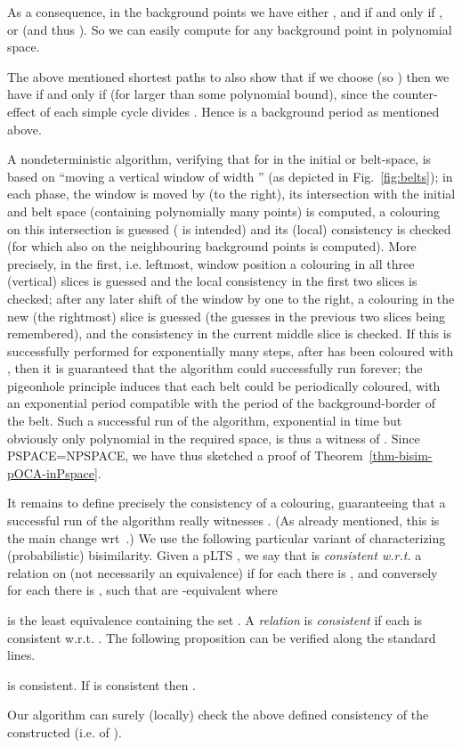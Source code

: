 As a consequence, in the background points 
we have either ,
and  if and only if ,
or 
(and thus  ).
So we can easily compute  for any background point in
polynomial space.

The above mentioned shortest paths to  also show that
if we choose  (so ) then
we have
 if and only if  (for  larger than
some polynomial bound), since the counter-effect of each simple cycle
divides .
Hence
 is a background period as mentioned above.

A nondeterministic algorithm, verifying that  for   in the initial or belt-space,
is based on ``moving a
vertical window of width '' (as depicted in Fig.~\ref{fig:belts});
in each phase, the window is moved by  (to the right),
its intersection with the initial and belt space
(containing polynomially many
points) is computed, a colouring
on this intersection is guessed
 ( is intended)
and its (local) consistency is
checked (for which also 
on the neighbouring background points is computed).
More precisely, in the first, i.e. leftmost, window position a
colouring in all
three (vertical) slices is guessed and the local consistency in the first two
slices is checked; after any later shift of the window
by one to the right, a colouring in
the new (the rightmost) slice is
guessed (the guesses in the previous two slices being remembered), and
the consistency in the current middle slice is checked.
If this is successfully performed
for exponentially many steps,
after  has been coloured with , then
it is guaranteed that
the algorithm could successfully run forever; the pigeonhole principle
induces that each belt could be periodically coloured, with an
exponential period compatible with the period of the background-border
of the belt.
Such a successful run of the algorithm, exponential in time but
obviously only
polynomial in the required space, is thus a witness of . Since PSPACE=NPSPACE, we have thus sketched a proof
 of Theorem~\ref{thm-bisim-pOCA-inPspace}.




It remains to define precisely the consistency of a colouring,
guaranteeing that a successful run of the algorithm really witnesses
. (As already mentioned, this is the main
change wrt~\cite{BGJ:Concur10}.)
We use the following particular variant of
characterizing (probabilistic) bisimilarity.
Given a pLTS
,
we say that  is \emph{consistent w.r.t.}
a relation  on  (not necessarily an equivalence)
if
for each  there is  ,
and conversely for each  there is  ,
such that  are -equivalent where

is the least equivalence containing the set
.
A \emph{relation}  is \emph{consistent} if each  is consistent w.r.t.
. The following proposition can be verified along the standard
lines.


\begin{proposition}\label{prop:localconsistency}
 is consistent.
If  is consistent then .
\end{proposition}
Our algorithm can surely (locally) check the above defined
consistency of the
constructed 
(i.e. of ).


